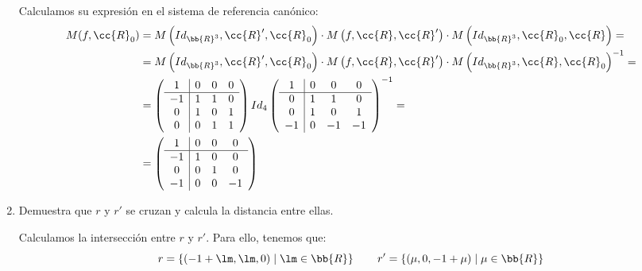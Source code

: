 \documentclass[12pt]{article}
\begin{document}
\begin{ejercicio}[2.5 puntos]
\begin{enumerate}
            Calculamos su expresión en el sistema de referencia canónico:
            \begin{align*}
                M(f, \cc{R}_0) &= M\left(Id_{\bb{R}^3}, \cc{R}', \cc{R}_0\right) \cdot M\left(f, \cc{R}, \cc{R}'\right) \cdot M\left(Id_{\bb{R}^3}, \cc{R}_0, \cc{R}\right) = \\
                &= M\left(Id_{\bb{R}^3}, \cc{R}', \cc{R}_0\right) \cdot M\left(f, \cc{R}, \cc{R}'\right) \cdot M\left(Id_{\bb{R}^3}, \cc{R}, \cc{R}_0\right)^{-1} = \\
                &=\left(
                    \begin{array}{c|ccc}
                        1 & 0 & 0 & 0 \\
                        \hline
                        -1 & 1 & 1 & 0 \\
                        0 & 1 & 0 & 1 \\
                        0 & 0 & 1 & 1
                    \end{array}
                \right)
                Id_{4}
                \left(
                    \begin{array}{c|ccc}
                        1 & 0 & 0 & 0 \\
                        \hline
                        0 & 1 & 1 & 0 \\
                        0 & 1 & 0 & 1 \\
                        -1 & 0 & -1 & -1
                    \end{array}
                \right)^{-1} = \\
                &=\left(
                    \begin{array}{c|ccc}
                        1 & 0 & 0 & 0 \\
                        \hline
                        -1 & 1 & 0 & 0 \\
                        0 & 0 & 1 & 0 \\
                        -1 & 0 & 0 & -1
                    \end{array}
                \right)
            \end{align*}

            \item Demuestra que $r$ y $r'$ se cruzan y calcula la distancia entre ellas.
            
            Calculamos la intersección entre $r$ y $r'$. Para ello, tenemos que:
            \begin{equation*}
                r = \left\{(-1+\lm, \lm, 0) \mid \lm \in \bb{R}\right\} \qquad
                r' = \left\{(\mu, 0, -1+\mu) \mid \mu \in \bb{R}\right\}
            \end{equation*}


\end{enumerate}
\end{ejercicio}
\end{document}
